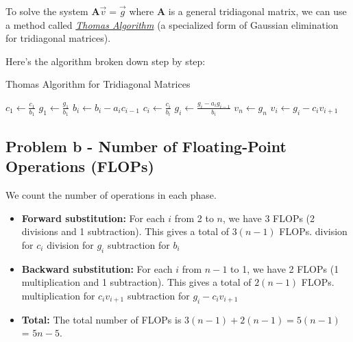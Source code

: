 \documentclass[english,notitlepage]{revtex4-1}  %
\begin{document}
To solve the system \( \mathbf{A} \vec{v} = \vec{g} \) where \( \mathbf{A} \) is a general tridiagonal matrix,
we can use a method called \textit{\href{https://en.wikipedia.org/wiki/Tridiagonal_matrix_algorithm}{Thomas Algorithm}}
(a specialized form of Gaussian elimination for tridiagonal matrices).


Here's the algorithm broken down step by step:

\begin{algorithm}[H]
    \caption{Thomas Algorithm for Tridiagonal Matrices}
    \begin{algorithmic}[1]
        \State \( c_1 \gets \frac{c_1}{b_1} \)
        \State \( g_1 \gets \frac{g_1}{b_1} \)
        \State \( b_i \gets b_i - a_i c_{i-1} \) 
        \State \( c_i \gets \frac{c_i}{b_i} \) 
        \EndIf
        \State \( g_i \gets \frac{g_i - a_i g_{i-1}}{b_i} \) 
        \EndFor
        \State \( v_n \gets g_n \) 
        \State \( v_i \gets g_i - c_i v_{i+1} \) 
        \EndFor
    \end{algorithmic}
\end{algorithm}

\subsection*{Problem b - Number of Floating-Point Operations (FLOPs)}

We count the number of operations in each phase.

\begin{itemize}
    \item \textbf{Forward substitution:} For each \( i \) from 2 to \( n \), we have 3 FLOPs (2 divisions and 1 subtraction). This gives a total of \( 3(n-1) \) FLOPs.
     division for \( c_i \)
     division for  \(g_i\)
     subtraction for \(b_i\)
    \item \textbf{Backward substitution:} For each \( i \) from \( n-1 \) to 1, we have 2 FLOPs (1 multiplication and 1 subtraction). This gives a total of \( 2(n-1) \) FLOPs.
     multiplication for \(c_i v_{i+1}\)
     subtraction for \(g_i - c_i v_{i+1}\)
    \item \textbf{Total:} The total number of FLOPs is \( 3(n-1) + 2(n-1) = 5(n-1) \) = \( 5n - 5 \).
\end{itemize}
\end{document}
